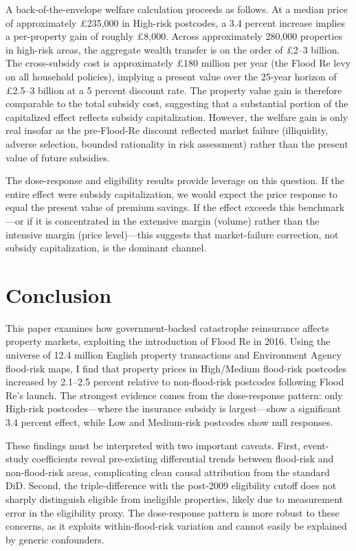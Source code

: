 \documentclass[12pt]{article}
\begin{document}
A back-of-the-envelope welfare calculation proceeds as follows. At a median price of approximately \pounds235,000 in High-risk postcodes, a 3.4 percent increase implies a per-property gain of roughly \pounds8,000. Across approximately 280,000 properties in high-risk areas, the aggregate wealth transfer is on the order of \pounds2--3 billion. The cross-subsidy cost is approximately \pounds180 million per year (the Flood Re levy on all household policies), implying a present value over the 25-year horizon of \pounds2.5--3 billion at a 5 percent discount rate. The property value gain is therefore comparable to the total subsidy cost, suggesting that a substantial portion of the capitalized effect reflects subsidy capitalization. However, the welfare gain is only real insofar as the pre-Flood-Re discount reflected market failure (illiquidity, adverse selection, bounded rationality in risk assessment) rather than the present value of future subsidies.

The dose-response and eligibility results provide leverage on this question. If the entire effect were subsidy capitalization, we would expect the price response to equal the present value of premium savings. If the effect exceeds this benchmark---or if it is concentrated in the extensive margin (volume) rather than the intensive margin (price level)---this suggests that market-failure correction, not subsidy capitalization, is the dominant channel.


\section{Conclusion} \label{sec:conclusion}

This paper examines how government-backed catastrophe reinsurance affects property markets, exploiting the introduction of Flood Re in 2016. Using the universe of 12.4 million English property transactions and Environment Agency flood-risk maps, I find that property prices in High/Medium flood-risk postcodes increased by 2.1--2.5 percent relative to non-flood-risk postcodes following Flood Re's launch. The strongest evidence comes from the dose-response pattern: only High-risk postcodes---where the insurance subsidy is largest---show a significant 3.4 percent effect, while Low and Medium-risk postcodes show null responses.

These findings must be interpreted with two important caveats. First, event-study coefficients reveal pre-existing differential trends between flood-risk and non-flood-risk areas, complicating clean causal attribution from the standard DiD. Second, the triple-difference with the post-2009 eligibility cutoff does not sharply distinguish eligible from ineligible properties, likely due to measurement error in the eligibility proxy. The dose-response pattern is more robust to these concerns, as it exploits within-flood-risk variation and cannot easily be explained by generic confounders.
\end{document}
